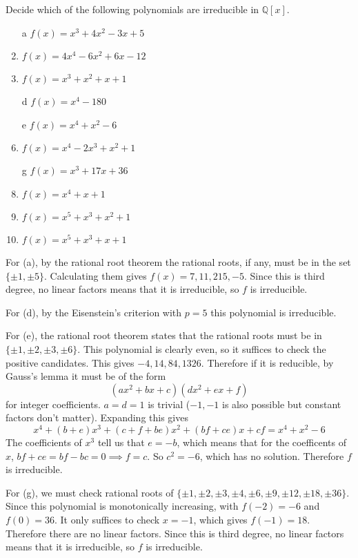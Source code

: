   \begin{exercise}[Shifrin 3.3.2.a/d/e/g]
    Decide which of the following polynomials are irreducible in
    $\mathbb{Q}[x]$.
    \begin{enumerate}
      \item[a] $f(x) = x^3 + 4x^2 - 3x + 5$
      \item $f(x) = 4x^4 - 6x^2 + 6x - 12$
      \item $f(x) = x^3 + x^2 + x + 1$
      \item[d] $f(x) = x^4 - 180$
      \item[e] $f(x) = x^4 + x^2 - 6$
      \item $f(x) = x^4 - 2x^3 + x^2 + 1$
      \item[g] $f(x) = x^3 + 17x + 36$
      \item $f(x) = x^4 + x + 1$
      \item $f(x) = x^5 + x^3 + x^2 + 1$
      \item $f(x) = x^5 + x^3 + x + 1$
    \end{enumerate}
  \end{exercise}
  \begin{solution}
    For (a), by the rational root theorem the rational roots, if any, must be in the set $\{\pm 1, \pm 5\}$. Calculating them gives $f(x) = 7, 11, 215, -5$. Since this is third degree, no linear factors means that it is irreducible, so $f$ is irreducible. 

    For (d), by the Eisenstein's criterion with $p = 5$ this polynomial is irreducible. 

    For (e), the rational root theorem states that the rational roots must be in $\{\pm 1, \pm 2, \pm 3, \pm 6\}$. This polynomial is clearly even, so it suffices to check the positive candidates. This gives $-4, 14, 84, 1326$. Therefore if it is reducible, by Gauss's lemma it must be of the form 
    \begin{equation}
      (ax^2 + bx + c)(dx^2 + ex + f)
    \end{equation} 
    for integer coefficients. $a = d = 1$ is trivial ($-1, -1$ is also possible but constant factors don't matter). Expanding this gives 
    \begin{equation}
      x^4 + (b + e) x^3 + (c + f + be) x^2 + (bf + ce) x + cf = x^4 + x^2 - 6
    \end{equation}
    The coefficients of $x^3$ tell us that $e = -b$, which means that for the coefficents of $x$, $bf + ce = bf - bc = 0 \implies f = c$. So $c^2 = -6$, which has no solution. Therefore $f$ is irreducible. 

    For (g), we must check rational roots of $\{\pm1, \pm2, \pm3, \pm4, \pm6, \pm9, \pm12, \pm18, \pm36\}$. Since this polynomial is monotonically increasing, with $f(-2) = -6$ and $f(0) = 36$. It only suffices to check $x = -1$, which gives $f(-1) = 18$. Therefore there are no linear factors. Since this is third degree, no linear factors means that it is irreducible, so $f$ is irreducible. 
  \end{solution}

